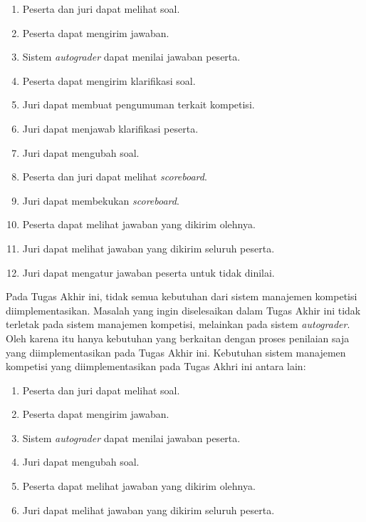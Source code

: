 \begin{enumerate}
    \item Peserta dan juri dapat melihat soal.
    \item Peserta dapat mengirim jawaban.
    \item Sistem \textit{autograder} dapat menilai jawaban peserta.
    \item Peserta dapat mengirim klarifikasi soal.
    \item Juri dapat membuat pengumuman terkait kompetisi.
    \item Juri dapat menjawab klarifikasi peserta.
    \item Juri dapat mengubah soal.
    \item Peserta dan juri dapat melihat \textit{scoreboard}.
    \item Juri dapat membekukan \textit{scoreboard}.
    \item Peserta dapat melihat jawaban yang dikirim olehnya.
    \item Juri dapat melihat jawaban yang dikirim seluruh peserta.
    \item Juri dapat mengatur jawaban peserta untuk tidak dinilai.
\end{enumerate}

\par Pada Tugas Akhir ini, tidak semua kebutuhan dari sistem manajemen kompetisi diimplementasikan. Masalah yang ingin diselesaikan dalam Tugas Akhir ini tidak terletak pada sistem manajemen kompetisi, melainkan pada sistem \textit{autograder}. Oleh karena itu hanya kebutuhan yang berkaitan dengan proses penilaian saja yang diimplementasikan pada Tugas Akhir ini. Kebutuhan sistem manajemen kompetisi yang diimplementasikan pada Tugas Akhri ini antara lain:

\begin{enumerate}
    \item Peserta dan juri dapat melihat soal.
    \item Peserta dapat mengirim jawaban.
    \item Sistem \textit{autograder} dapat menilai jawaban peserta.
    \item Juri dapat mengubah soal.
    \item Peserta dapat melihat jawaban yang dikirim olehnya.
    \item Juri dapat melihat jawaban yang dikirim seluruh peserta.
\end{enumerate}

